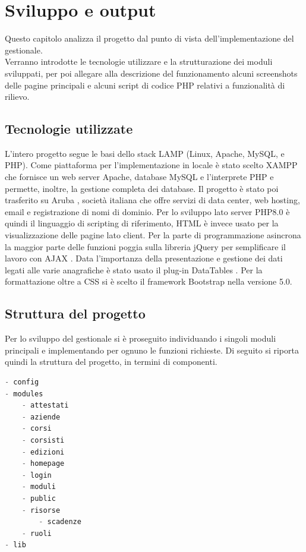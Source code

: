 \clearpage
\newpage
\chapter{Sviluppo e output}
\label{cha:789}
Questo capitolo analizza il progetto dal punto di vista dell'implementazione del gestionale.\\
Verranno introdotte le tecnologie utilizzare e la strutturazione dei moduli sviluppati, per poi allegare alla descrizione del funzionamento alcuni screenshots delle pagine principali e alcuni script di codice PHP relativi a funzionalità di rilievo.



\section{Tecnologie utilizzate}
\label{sec:tecnologie}
L'intero progetto segue le basi dello stack LAMP \cite{lamp} (Linux, Apache, MySQL, e PHP). Come piattaforma per l'implementazione in locale è stato scelto XAMPP \cite{xampp} che fornisce un web server Apache, database MySQL e l'interprete PHP e permette, inoltre, la gestione completa dei database. Il progetto è stato poi trasferito su Aruba \cite{aruba}, società italiana che offre servizi di data center, web hosting, email e registrazione di nomi di dominio.
Per lo sviluppo lato server PHP8.0 \cite{php} è quindi il linguaggio di scripting di riferimento, HTML \cite{html}\cite{html2} è invece usato per la visualizzazione delle pagine lato client.
Per la parte di programmazione asincrona \cite{asincrona} la maggior parte delle funzioni poggia sulla libreria jQuery \cite{jquery} per semplificare il lavoro con AJAX \cite{ajax}. Data l'importanza della presentazione e gestione dei dati legati alle varie anagrafiche è stato usato il plug-in DataTables \cite{datatables}.
Per la formattazione oltre a CSS \cite{css} si è scelto il framework Bootstrap \cite{bootstrap} nella versione 5.0. 

\section{Struttura del progetto}
\label{sec:struttura}
Per lo sviluppo del gestionale si è proseguito individuando i singoli moduli principali e implementando per ognuno le funzioni richieste. Di seguito si riporta quindi la struttura del progetto, in termini di componenti.
\begin{lstlisting}[language=c]
- config
- modules
	- attestati
	- aziende
	- corsi
	- corsisti
	- edizioni
	- homepage
	- login
	- moduli
	- public
	- risorse
		- scadenze
	- ruoli
- lib
\end{lstlisting}


